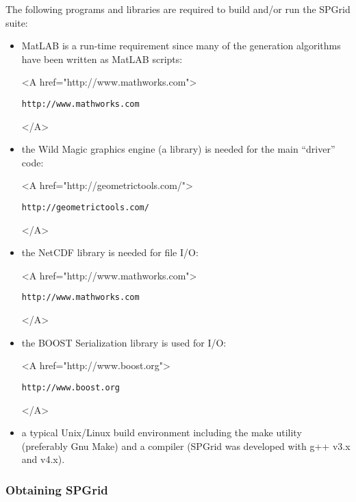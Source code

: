 The following programs and libraries are required to build and/or run
the SPGrid suite:
\begin{itemize}
\item MatLAB is a run-time requirement since many of the generation
  algorithms have been written as MatLAB scripts: \\
  \begin{rawhtml} <A href="http://www.mathworks.com"> \end{rawhtml}
  \texttt{http://www.mathworks.com}
  \begin{rawhtml} </A> \end{rawhtml}

\item the Wild Magic graphics engine (a \CC library) is needed for the
  main ``driver'' code: \\
  \begin{rawhtml} <A href="http://geometrictools.com/"> \end{rawhtml}
  \texttt{http://geometrictools.com/}
  \begin{rawhtml} </A> \end{rawhtml}

\item the NetCDF library is needed for file I/O: \\
  \begin{rawhtml} <A href="http://www.mathworks.com"> \end{rawhtml}
  \texttt{http://www.mathworks.com}
  \begin{rawhtml} </A> \end{rawhtml}

\item the BOOST Serialization library is used for I/O: \\
  \begin{rawhtml} <A href="http://www.boost.org"> \end{rawhtml}
  \texttt{http://www.boost.org}
  \begin{rawhtml} </A> \end{rawhtml}

\item a typical Unix/Linux build environment including the make
  utility (preferably Gnu Make) and a \CC compiler (SPGrid was
  developed with g++ v3.x and v4.x).
\end{itemize}


\subsubsection{Obtaining SPGrid}

